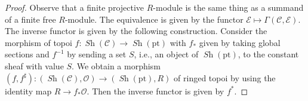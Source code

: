 \documentclass[10pt,a4paper]{amsart}
\theoremstyle{plain}
\theoremstyle{definition}
\theoremstyle{remark}
\numberwithin{equation}{subsection}
\def\Sh{\mathop{\mathit{Sh}}\nolimits}
\begin{document}
\begin{proof}
Observe that a finite projective $R$-module is the same thing
as a summand of a finite free $R$-module.
The equivalence is given by the functor $\mathcal{E} \mapsto
\Gamma(\mathcal{C}, \mathcal{E})$.
The inverse functor is given by the following construction.
Consider the morphism of topoi $f : \Sh(\mathcal{C}) \to \Sh(\text{pt})$
with $f_*$ given by taking global sections and
$f^{-1}$ by sending a set $S$, i.e., an object of
$\Sh(\text{pt})$, to the constant sheaf with value $S$.
We obtain a morphism
$(f, f^\sharp) : (\Sh(\mathcal{C}), \mathcal{O}) \to (\Sh(\text{pt}), R)$
of ringed topoi by using the identity map $R \to f_*\mathcal{O}$.
Then the inverse functor is given by $f^*$.
\end{proof}
\end{document}
